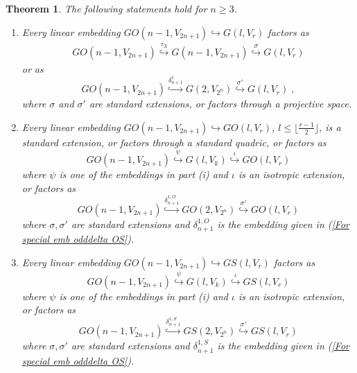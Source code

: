 \documentclass[12pt]{amsart}
\def\hw  {\hookrightarrow}
\newtheorem{theorem}{Theorem}[section]
\begin{document}
\begin{theorem}\label{Theo Embed GOcodim1odd}
The following statements hold for $n\geq 3$.
\begin{enumerate}
\item[{\rm (i)}] Every linear embedding $GO(n-1,V_{2n+1})\hookrightarrow G(l,V_r)$ factors as
\begin{gather}\label{For GO tau G s G}
GO(n-1,V_{2n+1}) \stackrel{\tau_X}{\hw} G(n-1,V_{2n+1}) \stackrel{\sigma}{\hw} G(l,V_{r})
\end{gather}
or as
$$
GO(n-1,V_{2n+1}) \stackrel{\delta^1_{n+1}}{\hookrightarrow} G(2,V_{2^n}) \stackrel{\sigma'}{\hw} G(l,V_{r})\;,
$$
where $\sigma$ and $\sigma'$ are standard extensions, or factors through a projective space.
\item[{\rm (ii)}] Every linear embedding $GO(n-1,V_{2n+1})\hookrightarrow GO(l,V_r)$, $l\leq\lfloor\frac{r-1}{2}\rfloor$, is a standard extension, or factors through a standard quadric, or factors as
$$
GO(n-1,V_{2n+1}) \stackrel{\psi}{\hw} G(l,V_{k}) \stackrel{\iota}{\hw} GO(l,V_{r})
$$
where $\psi$ is one of the embeddings in part {\rm(i)} and $\iota$ is an isotropic extension, or factors as
$$
GO(n-1,V_{2n+1}) \stackrel{\delta^{1,O}_{n+1}}{\hookrightarrow} GO(2,V_{2^n}) \stackrel{\sigma'}{\hw} GO(l,V_{r})
$$
where $\sigma,\sigma'$ are standard extensions and $\delta^{1,O}_{n+1}$ is the embedding given in (\ref{For special emb odddelta OS}).
\item[{\rm (iii)}] Every linear embedding $GO(n-1,V_{2n+1})\hookrightarrow GS(l,V_r)$ factors as
$$
GO(n-1,V_{2n+1}) \stackrel{\psi}{\hw} G(l,V_{k}) \stackrel{\iota}{\hw} GS(l,V_{r})
$$
where $\psi$ is one of the embeddings in part {\rm(i)} and $\iota$ is an isotropic extension, or factors as
$$
GO(n-1,V_{2n+1}) \stackrel{\delta^{1,S}_{n+1}}{\hookrightarrow} GS(2,V_{2^n}) \stackrel{\sigma'}{\hw} GS(l,V_{r})
$$
where $\sigma,\sigma'$ are standard extensions and $\delta^{1,S}_{n+1}$ is the embedding given in (\ref{For special emb odddelta OS}). 
\end{enumerate}
\end{theorem}
\end{document}
